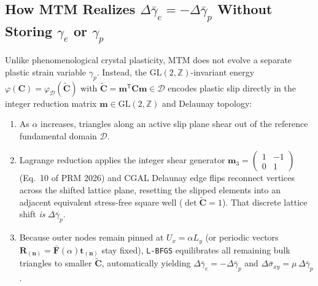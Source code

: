 \documentclass[11pt,a4paper]{article}
\newcommand{\Z}{\mathbb{Z}}
\newcommand{\T}{^{\mathsf T}}
\newcommand{\code}[1]{\texttt{#1}}
\newcommand{\dsigbar}{\Delta\bar{\sigma}_{xy}}
\begin{document}
\subsection{How MTM Realizes \texorpdfstring{$\Delta\bar{\gamma}_e = -\Delta\bar{\gamma}_p$}{Delta gamma\_e = -Delta gamma\_p} Without Storing \texorpdfstring{$\gamma_e$}{gamma\_e} or \texorpdfstring{$\gamma_p$}{gamma\_p}}

Unlike phenomenological crystal plasticity, MTM does not evolve a separate plastic strain variable $\gamma_p$. Instead, the $\mathrm{GL}(2,\Z)$-invariant energy $\varphi(\mathbf{C}) = \varphi_{\mathcal{D}}(\tilde{\mathbf{C}})$ with $\tilde{\mathbf{C}} = \mathbf{m}\T\mathbf{C}\mathbf{m} \in \mathcal{D}$ encodes plastic slip directly in the integer reduction matrix $\mathbf{m} \in \mathrm{GL}(2,\Z)$ and Delaunay topology:
\begin{enumerate}[nosep]
  \item As $\alpha$ increases, triangles along an active slip plane shear out of the reference fundamental domain $\mathcal{D}$.
  \item Lagrange reduction applies the integer shear generator $\mathbf{m}_3 = \begin{pmatrix} 1 & -1 \\ 0 & 1 \end{pmatrix}$ (Eq.~10 of PRM 2026) and CGAL Delaunay edge flips reconnect vertices across the shifted lattice plane, resetting the slipped elements into an adjacent equivalent stress-free square well ($\det\tilde{\mathbf{C}}=1$). That discrete lattice shift \emph{is} $\Delta\bar{\gamma}_p$.
  \item Because outer nodes remain pinned at $U_x = \alpha L_y$ (or periodic vectors $\mathbf{R}_{(\mathbf{n})} = \bar{\mathbf{F}}(\alpha)\mathbf{t}_{(\mathbf{n})}$ stay fixed), \code{L-BFGS} equilibrates all remaining bulk triangles to smaller $\tilde{\mathbf{C}}$, automatically yielding $\Delta\bar{\gamma}_e = -\Delta\bar{\gamma}_p$ and $\dsigbar = \mu\,\Delta\bar{\gamma}_p$.
\end{enumerate}
\end{document}
